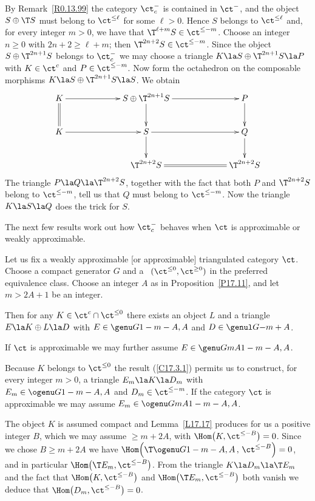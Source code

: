 \documentclass[11pt]{amsart}
\begin{document}
By Remark~\ref{R0.13.99} the category $\ct^-_c$ is contained in $\ct^-$,
and the object $S\oplus\T S$ must belong to $\ct^{\leq\ell} $ for some $\ell>0$.
Hence $S$ belongs to $\ct^{\leq\ell}$ and, for every  integer
$m>0$, we have that $\T^{\ell+m}S\in\ct^{\leq-m}$. Choose
an integer $n\geq0$ with $2n+2\geq\ell+m$; then
$\T^{2n+2}S\in\ct^{\leq-m}$.
Since the object $S\oplus\T^{2n+1}S$ belongs to $\ct^-_c$ we may choose
a triangle $K\la S\oplus\T^{2n+1}S\la P$ with
$K\in\ct^c$ and $P\in\ct^{\leq-m}$. Now form the octahedron on
the composable morphisms $K\la S\oplus\T^{2n+1}S\la S$. We
obtain
\[\xymatrix@C+40pt{
K \ar[r]\ar@{=}[d] & S\oplus\T^{2n+1}S \ar[r]\ar[d] & P\ar[d]\\
K \ar[r] &           S\ar[r]\ar[d] &           Q\ar[d] \\      
         &           \T^{2n+2}S \ar@{=}[r] &  \T^{2n+2}S
}\]
The triangle $P\la Q\la  \T^{2n+2}S$, together with
the fact that both $P$ and $ \T^{2n+2}S$ belong to $\ct^{\leq-m}$,
tell us that $Q$ must belong to $\ct^{\leq-m}$. Now
the triangle $K\la S\la Q$ does the trick for
$S$.
\eprf

The next few results work out how $\ct^-_c$ behaves when $\ct$
is approximable or weakly approximable.

Let us fix a weakly approximable [or approximable]
triangulated category $\ct$. Choose a compact
generator $G$ and a \tstr\ $(\ct^{\leq0},\ct^{\geq0})$
in the preferred equivalence class. Choose an
integer $A$ as in Proposition~\ref{P17.11},
and
let $m>2A+1$ be an integer.

Then for any $K\in\ct^c\cap\ct^{\leq0}$
there exists an object $L$ and a triangle
$E\la K\oplus L\la D$ with $E\in\genu G{}{1-m-A,A}$ and
$D\in\genul G{}{-m+A}$.

If $\ct$ is approximable we may further assume $E\in\genu G{mA}{1-m-A,A}$.
\elem

\prf
Because $K$ belongs to $\ct^{\leq0}$ the result (\ref{C17.3.1}) permits us
to construct, for every integer $m>0$, a triangle $E_m\la K\la D_m$ with
$E_m\in\ogenu G{}{1-m-A,A}$ and
$D_m\in\ct^{\leq-m}$. If the category $\ct$ is approximable
we may assume $E_m\in\ogenu G{mA}{1-m-A,A}$.

The object $K$ is assumed compact and Lemma~\ref{L17.17} produces
for us a positive integer $B$, which we
may assume $\geq m+2A$, with $\Hom\big(K,\ct^{\leq-B}\big)=0$.
Since we chose $B\geq m+2A$ we have 
$\Hom\Big(\T\ogenu G{}{1-m-A,A}\,,\,\ct^{\leq-B}\Big)=0$,
and in particular 
$\Hom\big(\T E_m,\ct^{\leq -B}\big)$. From the triangle
$K\la D_m\la \T E_m$ and the fact that $\Hom\big(K,\ct^{\leq -B}\big)$
and $\Hom\big(\T E_m,\ct^{\leq -B}\big)$ both vanish we deduce
that $\Hom\big(D_m,\ct^{\leq-B}\big)=0$.
\end{document}
